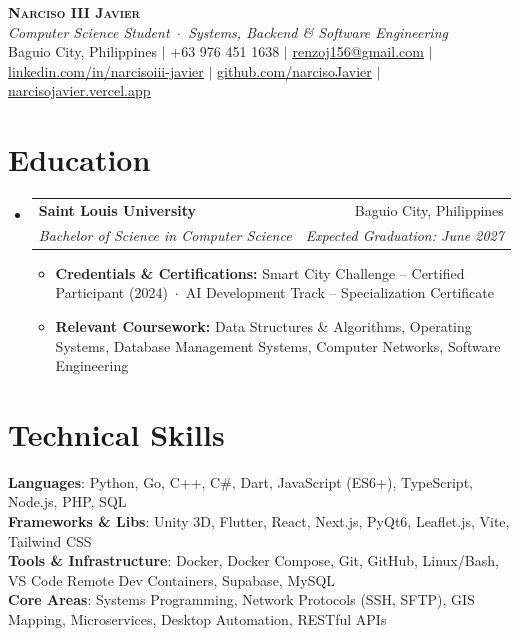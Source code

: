 \documentclass[letterpaper,10.5pt]{article}
\makeatletter
\newcommand{\resumeItem}[1]{
  \item\small{
    {#1 \vspace{-1.5pt}}
  }
}
\newcommand{\resumeSubheading}[4]{
  \vspace{-1pt}\item
    \begin{tabular*}{0.97\textwidth}[t]{l@{\extracolsep{\fill}}r}
      \textbf{#1} & #2 \\
      \textit{\small#3} & \textit{\small #4} \\
    \end{tabular*}\vspace{-6pt}
}
\newcommand{\resumeSubHeadingListStart}{\begin{itemize}[leftmargin=0.15in, label={}]}
\newcommand{\resumeSubHeadingListEnd}{\end{itemize}}
\newcommand{\resumeItemListStart}{\begin{itemize}[leftmargin=0.15in]}
\newcommand{\resumeItemListEnd}{\end{itemize}\vspace{-4pt}}
\makeatother
\begin{document}
\begin{center}
    \textbf{\Huge \scshape Narciso III Javier} \\ \vspace{2pt}
    \textit{\small Computer Science Student \,$\cdot$\, Systems, Backend \& Software Engineering} \\ \vspace{3pt}
    \small Baguio City, Philippines $|$ +63 976 451 1638 $|$ \href{mailto:renzoj156@gmail.com}{\underline{renzoj156@gmail.com}} $|$ \href{https://linkedin.com/in/narcisoiii-javier}{\underline{linkedin.com/in/narcisoiii-javier}} $|$ \href{https://github.com/narcisoJavier}{\underline{github.com/narcisoJavier}} $|$ \href{https://narcisojavier.vercel.app}{\underline{narcisojavier.vercel.app}}
\end{center}

\section{Education}
  \resumeSubHeadingListStart
    \resumeSubheading
      {Saint Louis University}{Baguio City, Philippines}
      {Bachelor of Science in Computer Science}{Expected Graduation: June 2027}
      \resumeItemListStart
        \resumeItem{\textbf{Credentials \& Certifications:} Smart City Challenge -- Certified Participant (2024) \,$\cdot$\, AI Development Track -- Specialization Certificate}
        \resumeItem{\textbf{Relevant Coursework:} Data Structures \& Algorithms, Operating Systems, Database Management Systems, Computer Networks, Software Engineering}
      \resumeItemListEnd
  \resumeSubHeadingListEnd

\section{Technical Skills}
 \begin{itemize}[leftmargin=0.15in, label={}]
    \small{\item{
     \textbf{Languages}{: Python, Go, C++, C\#, Dart, JavaScript (ES6+), TypeScript, Node.js, PHP, SQL} \\
     \textbf{Frameworks \& Libs}{: Unity 3D, Flutter, React, Next.js, PyQt6, Leaflet.js, Vite, Tailwind CSS} \\
     \textbf{Tools \& Infrastructure}{: Docker, Docker Compose, Git, GitHub, Linux/Bash, VS Code Remote Dev Containers, Supabase, MySQL} \\
     \textbf{Core Areas}{: Systems Programming, Network Protocols (SSH, SFTP), GIS Mapping, Microservices, Desktop Automation, RESTful APIs}
    }}
 \end{itemize}
\end{document}
